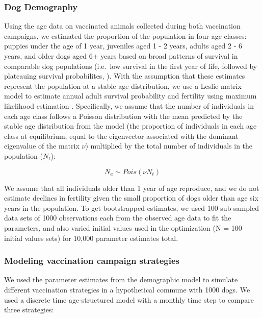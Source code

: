 \documentclass[tropicalmed,article,submit,moreauthors,pdftex]{mdpi}
\begin{document}
\hypertarget{dog-demography}{%
\subsubsection{Dog Demography}\label{dog-demography}}

Using the age data on vaccinated animals collected during both
vaccination campaigns, we estimated the proportion of the population in
four age classes: puppies under the age of 1 year, juveniles aged 1 - 2
years, adults aged 2 - 6 years, and older dogs aged 6+ years based on
broad patterns of survival in comparable dog populations (i.e.~low
survival in the first year of life, followed by plateauing survival
probabilites, \citep{czupryna2016, davlin2012}). With the assumption
that these estimates represent the population at a stable age
distribution, we use a Leslie matrix model to estimate annual adult
survival probability and fertility using maximum likelihood estimation
\citep{Fujiwara2017}. Specifically, we assume that the number of
individuals in each age class follows a Poisson distribution with the
mean predicted by the stable age distribution from the model (the
proportion of individuals in each age class at equilibrium, equal to the
eigenvector associated with the dominant eigenvalue of the matrix
\(\nu\)) multiplied by the total number of individuals in the population
(\(N_t\)):

\[ N_{a} \sim Pois(\nu N_t) \]

We assume that all individuals older than 1 year of age reproduce, and
we do not estimate declines in fertility given the small proportion of
dogs older than age six years in the population. To get bootstrapped
estimates, we used 100 sub-sampled data sets of 1000 observations each
from the observed age data to fit the parameters, and also varied
initial values used in the optimization (N = 100 initial values sets)
for 10,000 parameter estimates total.

\hypertarget{modeling-vaccination-campaign-strategies}{%
\subsubsection{Modeling vaccination campaign
strategies}\label{modeling-vaccination-campaign-strategies}}

We used the parameter estimates from the demographic model to simulate
different vaccination strategies in a hypothetical commune with 1000
dogs. We used a discrete time age-structured model with a monthly time
step to compare three strategies:
\end{document}
